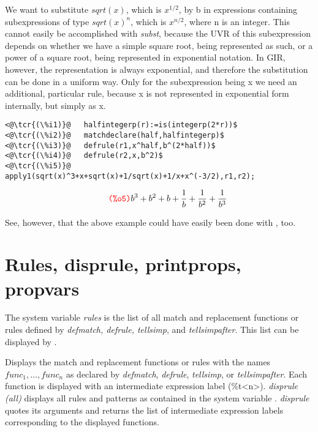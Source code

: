 \documentclass[../Maxima_Workbook.tex]{subfiles}
\begin{document}
\lz We want to substitute $ sqrt(x) $, which is $ x^{1/2} $, by b in expressions containing subexpressions of type $ sqrt(x)^n $, which is $ x^{n/2} $, where n is an integer. This cannot easily be accomplished with \emph{subst}, because the UVR of this subexpression depends on whether we have a simple square root, being represented as such, or a power of a square root, being represented in exponential notation. In GIR, however, the representation is always exponential, and therefore the substitution can be done in a uniform way. Only for the subexpression being x we need an additional, particular rule, because x is not represented in exponential form internally, but simply as x.

\lz \begin{small}
\color{blue} \leqn
\begin{lstlisting}
<@\tcr{(\%i1)}@   halfintegerp(r):=is(integerp(2*r))$
<@\tcr{(\%i2)}@   matchdeclare(half,halfintegerp)$
<@\tcr{(\%i3)}@   defrule(r1,x^half,b^(2*half))$
<@\tcr{(\%i4)}@   defrule(r2,x,b^2)$
<@\tcr{(\%i5)}@   apply1(sqrt(x)^3+x+sqrt(x)+1/sqrt(x)+1/x+x^(-3/2),r1,r2);
\end{lstlisting}
\vspace{-4mm} \[\tag*{\tcr{\ttfamily (\%o5)}} {{b}^{3}}+{{b}^{2}}+b+\frac{1}{b}+\frac{1}{{{b}^{2}}}+\frac{1}{{{b}^{3}}} \]
\color{black} \reqn
\end{small} \vspace{-4mm}

\lz See, however, that the above example could have easily been done with , too.

\section{Rules, disprule, printprops, propvars}

 \hfill {}

\lz The system variable \emph{rules} is the list of all match and replacement functions or rules defined by \emph{defmatch, defrule, tellsimp}, and \emph{tellsimpafter}. This list can be displayed by .

\lzz {} \hfill \tcr{[function]}

\lz Displays the match and replacement functions or rules with the names $ func_1,\dots,func_n $ as declared by \emph{defmatch}, \emph{defrule}, \emph{tellsimp}, or \emph{tellsimpafter}. Each function is displayed with an intermediate expression label (\%t<n>). \emph{disprule (all)} displays all rules and patterns as contained in the system variable . \emph{disprule} quotes its arguments and returns the list of intermediate expression labels corresponding to the displayed functions.
\end{document}
